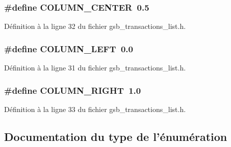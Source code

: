 \subsubsection[{COLUMN\_\-CENTER}]{\setlength{\rightskip}{0pt plus 5cm}\#define COLUMN\_\-CENTER~0.5}\label{gsb__transactions__list_8h_a1acc57689f7f1675288fb8a4b29fb4e7}


Définition à la ligne 32 du fichier gsb\_\-transactions\_\-list.h.

\subsubsection[{COLUMN\_\-LEFT}]{\setlength{\rightskip}{0pt plus 5cm}\#define COLUMN\_\-LEFT~0.0}\label{gsb__transactions__list_8h_a6af7ccb9deda7edaeea9ca8bfc7c6b37}


Définition à la ligne 31 du fichier gsb\_\-transactions\_\-list.h.

\subsubsection[{COLUMN\_\-RIGHT}]{\setlength{\rightskip}{0pt plus 5cm}\#define COLUMN\_\-RIGHT~1.0}\label{gsb__transactions__list_8h_a854253903a51c832eec04ab2ac08901b}


Définition à la ligne 33 du fichier gsb\_\-transactions\_\-list.h.



\subsection{Documentation du type de l'énumération}
